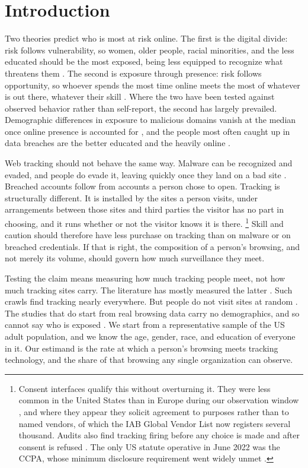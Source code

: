 \documentclass[12pt, letterpaper]{article}
\begin{document}
\section{Introduction}
Two theories predict who is most at risk online. The first is the digital divide: risk follows vulnerability, so women, older people, racial minorities, and the less educated should be the most exposed, being less equipped to recognize what threatens them \citep{vandeursen2011internet, hadlington2018segmentation, whitty2019predicting}. The second is exposure through presence: risk follows opportunity, so whoever spends the most time online meets the most of whatever is out there, whatever their skill \citep{simoiu2020targeted, baki2023sixteen}. Where the two have been tested against observed behavior rather than self-report, the second has largely prevailed. Demographic differences in exposure to malicious domains vanish at the median once online presence is accounted for \citep{bad_domains}, and the people most often caught up in data breaches are the better educated and the heavily online \citep{cor2018pwned}.

Web tracking should not behave the same way. Malware can be recognized and evaded, and people do evade it, leaving quickly once they land on a bad site \citep{bad_domains}. Breached accounts follow from accounts a person chose to open. Tracking is structurally different. It is installed by the sites a person visits, under arrangements between those sites and third parties the visitor has no part in choosing, and it runs whether or not the visitor knows it is there.%
\footnote{
Consent interfaces qualify this without overturning it. They were less common in the United States than in Europe during our observation window \citep{jha2022consent}, and where they appear they solicit agreement to purposes rather than to named vendors, of which the IAB Global Vendor List now registers several thousand. Audits also find tracking firing before any choice is made and after consent is refused \citep{matte2020cookiebanners, papadogiannakis2021postcookie}. The only US statute operative in June 2022 was the CCPA, whose minimum disclosure requirement went widely unmet \citep{vannortwick2022ccpa}.
}
Skill and caution should therefore have less purchase on tracking than on malware or on breached credentials. If that is right, the composition of a person's browsing, and not merely its volume, should govern how much surveillance they meet.

Testing the claim means measuring how much tracking people meet, not how much tracking sites carry. The literature has mostly measured the latter \citep{Englehardt2016, karaj2018whotracks}. Such crawls find tracking nearly everywhere. But people do not visit sites at random \citep{Dambra2022}. The studies that do start from real browsing data carry no demographics, and so cannot say who is exposed \citep{trackingthetrackers, Dambra2022}. We start from a representative sample of the US adult population, and we know the age, gender, race, and education of everyone in it.
Our estimand is the rate at which a person's browsing meets tracking technology, and the share of that browsing any single organization can observe.
\end{document}

